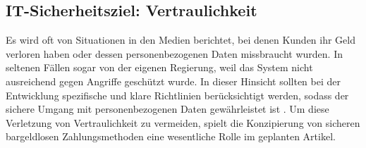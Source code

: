 \subsection{IT-Sicherheitsziel: Vertraulichkeit}
Es wird oft von Situationen in den Medien berichtet, bei denen Kunden ihr Geld verloren haben oder dessen
personenbezogenen Daten missbraucht wurden. In seltenen Fällen sogar von der eigenen Regierung, weil das System 
nicht ausreichend gegen Angriffe geschützt wurde. In dieser Hinsicht sollten bei der Entwicklung spezifische 
und klare Richtlinien berücksichtigt werden, sodass der sichere Umgang mit personenbezogenen Daten gewährleistet ist 
\cite{refart:TRVR}. Um diese Verletzung von Vertraulichkeit zu vermeiden, spielt die Konzipierung von sicheren 
bargeldlosen Zahlungsmethoden eine wesentliche Rolle im geplanten Artikel. 